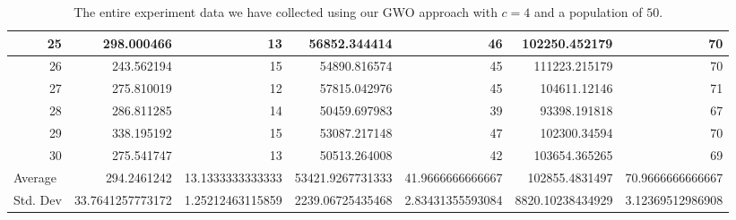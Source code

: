 \begin{table}
\begin{adjustwidth}{}{}
{{\begin{tabular}{|r|r|r|r|r|r|r|}
					\hline
					25                                         & 298.000466                   & 13                                    & 56852.344414                   & 46                                    & 102250.452179                & 70                                     \\ 
					\hline
					26                                         & 243.562194                   & 15                                    & 54890.816574                   & 45                                    & 111223.215179                & 70                                     \\ 
					\hline
					27                                         & 275.810019                   & 12                                    & 57815.042976                   & 45                                    & 104611.12146                 & 71                                     \\ 
					\hline
					28                                         & 286.811285                   & 14                                    & 50459.697983                   & 39                                    & 93398.191818                 & 67                                     \\ 
					\hline
					29                                         & 338.195192                   & 15                                    & 53087.217148                   & 47                                    & 102300.34594                 & 70                                     \\ 
					\hline
					30                                         & 275.541747                   & 13                                    & 50513.264008                   & 42                                    & 103654.365265                & 69                                     \\ 
					\hline
					\multicolumn{1}{|l|}{Average}              & 294.2461242                  & 13.1333333333333                      & 53421.9267731333               & 41.9666666666667                      & 102855.4831497               & 70.9666666666667                       \\ 
					\hline
					\multicolumn{1}{|l|}{Std. Dev}             & 33.7641257773172             & 1.25212463115859                      & 2239.06725435468               & 2.83431355593084                      & 8820.10238434929             & 3.12369512986908                       \\
					\hline
		\end{tabular}}}
	\end{adjustwidth}
	\caption{The entire experiment data we have collected using our GWO approach with $c = 4$ and a population of $50$.}
	\label{full-data-gwo-c4-p50}
\end{table}


